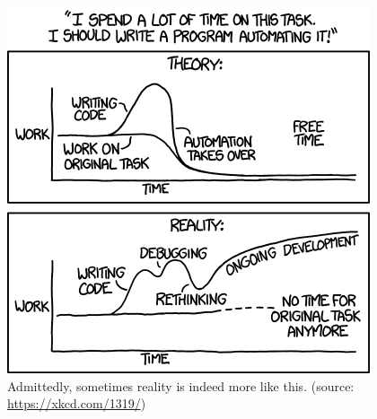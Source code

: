 \documentclass[12pt,letterpaper]{article}
\begin{document}
\begin{figure}
	\centering
	\includegraphics[width=0.7\linewidth]{figs/automation.png}
	\caption{Admittedly, sometimes reality is indeed more like this.  (source: \url{https://xkcd.com/1319/})}
	\label{fig:automation}
\end{figure}
\end{document}
